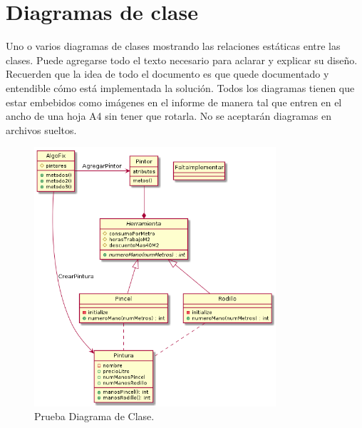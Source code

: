 \documentclass[titlepage,a4paper]{article}
\begin{document}
\section{Diagramas de clase}\label{sec:diagramasdeclase}
Uno o varios diagramas de clases mostrando las relaciones estáticas entre las clases.  
Puede agregarse todo el texto necesario para aclarar y explicar su diseño. 
Recuerden que la idea de todo el documento es que quede documentado y entendible cómo está implementada la solución. 
Todos los diagramas tienen que estar embebidos como imágenes en el informe de manera tal que entren en el ancho de una hoja A4 
sin tener que rotarla.  No se aceptarán diagramas en archivos sueltos. 



\begin{figure}[H]
  \centering
  \includegraphics[width=0.8\textwidth]{diagrama_clase01.png}
  \caption{\label{fig:class01}Prueba Diagrama de Clase.}
  \end{figure}

\end{document}
